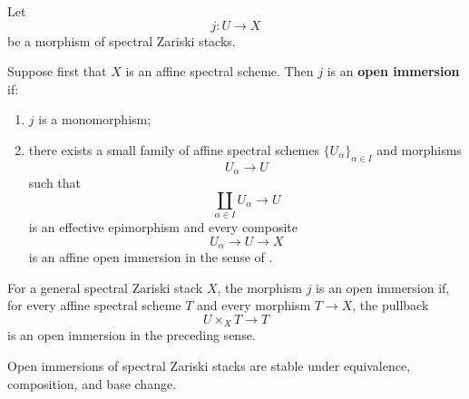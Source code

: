 \begin{definition}
\label{def:open-immersion-spectral-stacks}
Let
\[
    j
    \colon
    U
    \longrightarrow
    X
\]
be a morphism of spectral Zariski stacks.

Suppose first that $X$ is an affine spectral scheme. Then $j$ is an
\textbf{open immersion} if:
\begin{enumerate}[label=(\roman*)]
    \item $j$ is a monomorphism;

    \item there exists a small family of affine spectral schemes
    $\{U_\alpha\}_{\alpha\in I}$ and morphisms
    \[
        U_\alpha
        \longrightarrow
        U
    \]
    such that
    \[
        \coprod_{\alpha\in I}U_\alpha
        \longrightarrow
        U
    \]
    is an effective epimorphism and every composite
    \[
        U_\alpha
        \longrightarrow
        U
        \longrightarrow
        X
    \]
    is an affine open immersion in the sense of
    .
\end{enumerate}

For a general spectral Zariski stack $X$, the morphism $j$ is an open
immersion if, for every affine spectral scheme $T$ and every morphism
$T\to X$, the pullback
\[
    U\times_XT
    \longrightarrow
    T
\]
is an open immersion in the preceding sense.
\end{definition}

\begin{proposition}
\label{prop:global-open-immersion-permanence}
Open immersions of spectral Zariski stacks are stable under equivalence,
composition, and base change.
\end{proposition}

